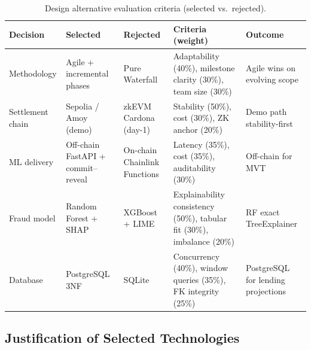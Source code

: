 \documentclass[12pt,a4paper]{report}
\newcommand{\tableheadcolor}{\rowcolor{TableHeadBg}}
\begin{document}
\begin{table}[H]
\centering
\caption[Design alternative evaluation criteria]{Design alternative evaluation criteria (selected vs.\ rejected).}
\label{tab:design-alternatives-criteria}
\footnotesize
\begin{tabular}{@{}p{2.6cm}p{2.2cm}p{2.2cm}p{2.8cm}p{3.4cm}@{}}
\toprule
\tableheadcolor
\textbf{Decision} & \textbf{Selected} & \textbf{Rejected} & \textbf{Criteria (weight)} & \textbf{Outcome} \\
\midrule
Methodology & Agile + incremental phases & Pure Waterfall & Adaptability (40\%), milestone clarity (30\%), team size (30\%) & Agile wins on evolving scope \\
Settlement chain & Sepolia / Amoy (demo) & zkEVM Cardona (day-1) & Stability (50\%), cost (30\%), ZK anchor (20\%) & Demo path stability-first \\
ML delivery & Off-chain FastAPI + commit--reveal & On-chain Chainlink Functions & Latency (35\%), cost (35\%), auditability (30\%) & Off-chain for MVT \\
Fraud model & Random Forest + SHAP & XGBoost + LIME & Explainability consistency (50\%), tabular fit (30\%), imbalance (20\%) & RF exact TreeExplainer \\
Database & PostgreSQL 3NF & SQLite & Concurrency (40\%), window queries (35\%), FK integrity (25\%) & PostgreSQL for lending projections \\
\bottomrule
\end{tabular}
\end{table}

\subsection{Justification of Selected Technologies}
\end{document}
